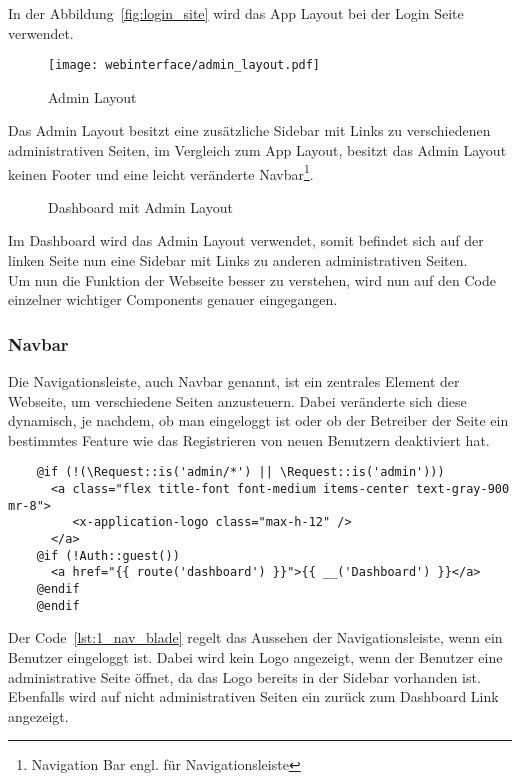 In der Abbildung~\ref{fig:login_site} wird das App Layout bei der Login Seite verwendet.

\begin{figure}[H]
  \centering
  \texttt{[image: webinterface/admin\_layout.pdf]}
  \caption{Admin Layout}
\end{figure}

Das Admin Layout besitzt eine zusätzliche Sidebar mit Links zu verschiedenen
administrativen Seiten, im Vergleich zum App Layout, besitzt das Admin
Layout keinen Footer und eine leicht veränderte Navbar\footnote{Navigation Bar
engl. für Navigationsleiste}.

\begin{figure}[H]
  \centering
  \caption{Dashboard mit Admin Layout}
\end{figure}

Im Dashboard wird das Admin Layout verwendet, somit befindet sich auf der linken
Seite nun eine Sidebar mit Links zu anderen administrativen Seiten.\\

Um nun die Funktion der Webseite besser zu verstehen, wird nun auf den Code
einzelner wichtiger Components genauer eingegangen.

\subsubsection{Navbar}
Die Navigationsleiste, auch Navbar genannt, ist ein zentrales Element der Webseite,
um verschiedene Seiten anzusteuern. Dabei veränderte sich diese dynamisch, je
nachdem, ob man eingeloggt ist oder ob der Betreiber der Seite ein bestimmtes Feature wie das
Registrieren von neuen Benutzern deaktiviert hat.

\begin{listing}[H]
  \begin{verbatim}
    @if (!(\Request::is('admin/*') || \Request::is('admin')))
      <a class="flex title-font font-medium items-center text-gray-900 mr-8">
         <x-application-logo class="max-h-12" />
      </a>
    @if (!Auth::guest())
      <a href="{{ route('dashboard') }}">{{ __('Dashboard') }}</a>
    @endif
    @endif
  \end{verbatim}
  \caption{Ausschnitt 1 Navigationsleiste}
  \label{lst:1_nav_blade}
\end{listing}

Der Code~\ref{lst:1_nav_blade} regelt das Aussehen der Navigationsleiste, wenn ein Benutzer
eingeloggt ist. Dabei wird kein Logo angezeigt, wenn der Benutzer eine
administrative Seite öffnet, da das Logo bereits in der
Sidebar vorhanden ist. Ebenfalls wird auf nicht administrativen Seiten ein
zurück zum Dashboard Link angezeigt.

